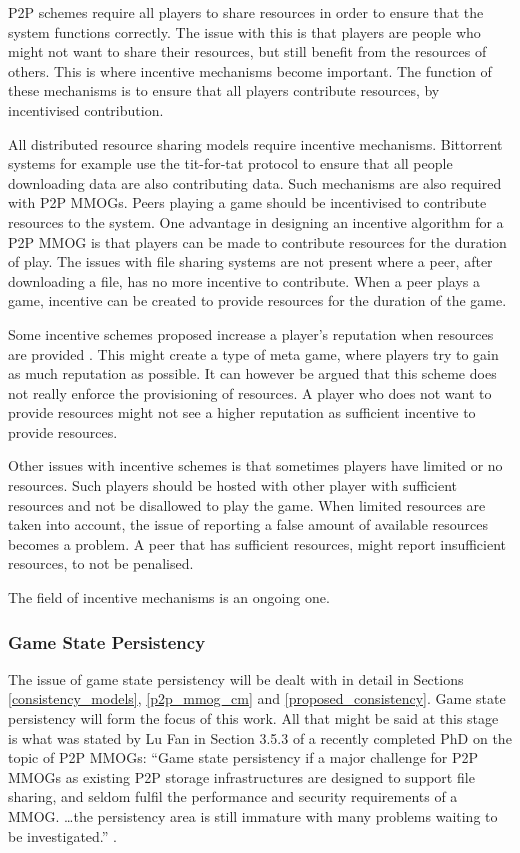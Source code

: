\documentclass[journal,oneside,a4paper,onecolumn]{IEEEtran}
\begin{document}
P2P schemes require all players to share resources in order to ensure that the system functions correctly. The issue with this is that players are people who might not want to share their resources, but still benefit from the resources of others. This is where incentive mechanisms become important. The function of these mechanisms is to ensure that all players contribute resources, by incentivised contribution.

All distributed resource sharing models require incentive mechanisms. Bittorrent systems for example use the tit-for-tat protocol \cite{tit_for_tat} to ensure that all people downloading data are also contributing data. Such mechanisms are also required with P2P MMOGs. Peers playing a game should be incentivised to contribute resources to the system. One advantage in designing an incentive algorithm for a P2P MMOG is that players can be made to contribute resources for the duration of play. The issues with file sharing systems are not present where a peer, after downloading a file, has no more incentive to contribute. When a peer plays a game, incentive can be created to provide resources for the duration of the game.

Some incentive schemes proposed increase a player's reputation when resources are provided \cite{classic_p2p_reputation} \cite{proactive_reputation}. This might create a type of meta game, where players try to gain as much reputation as possible. It can however be argued that this scheme does not really enforce the provisioning of resources. A player who does not want to provide resources might not see a higher reputation as sufficient incentive to provide resources.

Other issues with incentive schemes is that sometimes players have limited or no resources. Such players should be hosted with other player with sufficient resources and not be disallowed to play the game. When limited resources are taken into account, the issue of reporting a false amount of available resources becomes a problem. A peer that has sufficient resources, might report insufficient resources, to not be penalised.

The field of incentive mechanisms is an ongoing one.

\subsubsection{Game State Persistency}

The issue of game state persistency will be dealt with in detail in Sections \ref{consistency_models}, \ref{p2p_mmog_cm} and \ref{proposed_consistency}. Game state persistency will form the focus of this work. All that might be said at this stage is what was stated by Lu Fan in Section 3.5.3 of a recently completed PhD on the topic of P2P MMOGs: ``Game state persistency if a major challenge for P2P MMOGs as existing P2P storage infrastructures are designed to support file sharing, and seldom fulfil the performance and security requirements of a MMOG. \ldots the persistency area is still immature with many problems waiting to be investigated.'' \cite{Fan_phd}.
\end{document}
